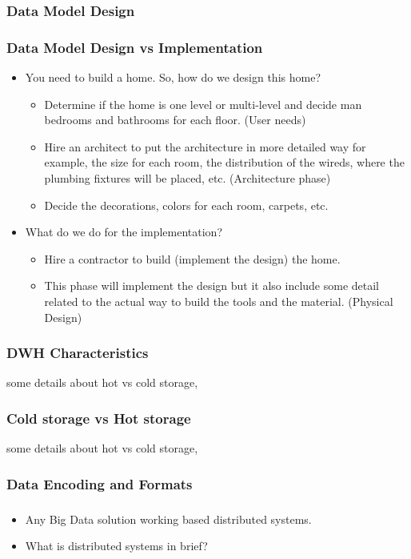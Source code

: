 \subsubsection{Data Model Design}
\begin{frame}
\frametitle{Data Model Design vs Implementation}
	\begin{itemize}[<+->]
	\item You need to build a home. So, how do we design this home?
		\begin{itemize}[<+->]
			\item Determine if the home is one level or multi-level and decide man bedrooms and bathrooms for each floor. (User needs)
			\item Hire an architect to put the architecture in more detailed way for example, the size for each room, the distribution of the wireds, where the plumbing fixtures will be placed, etc. (Architecture phase)
			\item Decide the decorations, colors for each room, carpets, etc. 
		\end{itemize}
	\item What do we do for the implementation?
		\begin{itemize}[<+->]
			\item Hire a contractor to build (implement the design) the home. 
			\item This phase will implement the design but it also include some detail related to the actual way to build the tools and the material. (Physical Design)
		\end{itemize}		
	\end{itemize}
\end{frame}

\begin{frame}
\frametitle{DWH Characteristics}


some details about hot vs cold storage,

\end{frame}

\begin{frame}

\frametitle{Cold storage vs Hot storage}

some details about hot vs cold storage,

\end{frame}

\subsubsection{Data Encoding and Formats}
\begin{frame}
\frametitle{\subsecname}
\begin{itemize}[<+->]
\item Any Big Data solution working based distributed systems.
\item What is distributed systems in brief?
\end{itemize}
\end{frame}

